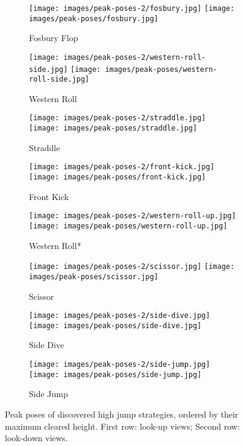 \begin{figure*}
    \centering
    \begin{subfigure}[b]{0.12\textwidth}
    \texttt{[image: images/peak-poses-2/fosbury.jpg]}
    \texttt{[image: images/peak-poses/fosbury.jpg]}
    \caption{Fosbury Flop}
    \end{subfigure}
    \begin{subfigure}[b]{0.12\textwidth}
    \texttt{[image: images/peak-poses-2/western-roll-side.jpg]}
    \texttt{[image: images/peak-poses/western-roll-side.jpg]}
    \caption{Western Roll}
    \end{subfigure}
    \begin{subfigure}[b]{0.12\textwidth}
    \texttt{[image: images/peak-poses-2/straddle.jpg]}
    \texttt{[image: images/peak-poses/straddle.jpg]}
    \caption{Straddle}
    \end{subfigure}
    \begin{subfigure}[b]{0.12\textwidth}
    \texttt{[image: images/peak-poses-2/front-kick.jpg]}
    \texttt{[image: images/peak-poses/front-kick.jpg]}
    \caption{Front Kick}
    \end{subfigure}
    \begin{subfigure}[b]{0.12\textwidth}
    \texttt{[image: images/peak-poses-2/western-roll-up.jpg]}
    \texttt{[image: images/peak-poses/western-roll-up.jpg]}
    \caption{Western Roll*}
    \end{subfigure}
    \begin{subfigure}[b]{0.12\textwidth}
    \texttt{[image: images/peak-poses-2/scissor.jpg]}
    \texttt{[image: images/peak-poses/scissor.jpg]}
    \caption{Scissor}
    \end{subfigure}
    \begin{subfigure}[b]{0.12\textwidth}
    \texttt{[image: images/peak-poses-2/side-dive.jpg]}
    \texttt{[image: images/peak-poses/side-dive.jpg]}
    \caption{Side Dive}
    \end{subfigure}
    \begin{subfigure}[b]{0.12\textwidth}
    \texttt{[image: images/peak-poses-2/side-jump.jpg]}
    \texttt{[image: images/peak-poses/side-jump.jpg]}
    \caption{Side Jump}
    \end{subfigure}
    \caption{Peak poses of discovered high jump strategies, ordered by their maximum cleared height. First row: look-up views; Second row: look-down views.}
    \label{fig:High-jump-peak-poses}
\end{figure*}
